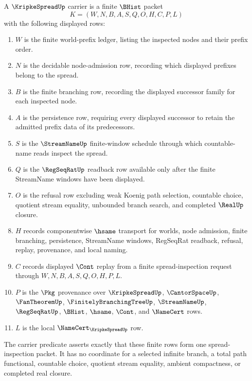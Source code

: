 \begin{definition}
\label{def:kripke-spread-carrier}
A $\KripkeSpreadUp$ carrier is a finite $\BHist$ packet
$$
K=(W,N,B,A,S,Q,O,H,C,P,L)
$$
with the following displayed rows:
\begin{enumerate}
\item $W$ is the finite world-prefix ledger, listing the inspected nodes and their prefix order.
\item $N$ is the decidable node-admission row, recording which displayed prefixes belong to the spread.
\item $B$ is the finite branching row, recording the displayed successor family for each inspected node.
\item $A$ is the persistence row, requiring every displayed successor to retain the admitted prefix data of its predecessors.
\item $S$ is the $\StreamNameUp$ finite-window schedule through which countable-name reads inspect the spread.
\item $Q$ is the $\RegSeqRatUp$ readback row available only after the finite StreamName windows have been displayed.
\item $O$ is the refusal row excluding weak Koenig path selection, countable choice, quotient stream equality, unbounded branch search, and completed $\RealUp$ closure.
\item $H$ records componentwise $\hsame$ transport for worlds, node admission, finite branching, persistence, StreamName windows, RegSeqRat readback, refusal, replay, provenance, and local naming.
\item $C$ records displayed $\Cont$ replay from a finite spread-inspection request through $W,N,B,A,S,Q,O,H,P,L$.
\item $P$ is the $\Pkg$ provenance over $\KripkeSpreadUp$, $\CantorSpaceUp$, $\FanTheoremUp$, $\FinitelyBranchingTreeUp$, $\StreamNameUp$, $\RegSeqRatUp$, $\BHist$, $\hsame$, $\Cont$, and $\NameCert$ rows.
\item $L$ is the local $\NameCert_{\KripkeSpreadUp}$ row.
\end{enumerate}
The carrier predicate asserts exactly that these finite rows form one spread-inspection packet. It has no coordinate for a selected infinite branch, a total path functional, countable choice, quotient stream equality, ambient compactness, or completed real closure.
\end{definition}

